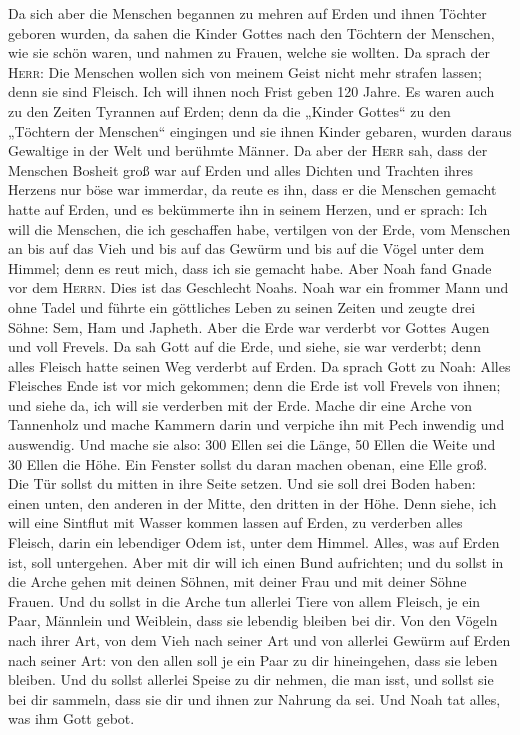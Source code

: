  Da sich aber die Menschen begannen zu mehren auf Erden
und ihnen Töchter geboren wurden,  da sahen die Kinder
Gottes nach den Töchtern der Menschen, wie sie schön waren, und nahmen
zu Frauen, welche sie wollten.  Da sprach der
\textsc{Herr}: Die Menschen wollen sich von meinem Geist nicht mehr
strafen lassen; denn sie sind Fleisch. Ich will ihnen noch Frist geben
120 Jahre.  Es waren auch zu den Zeiten Tyrannen auf
Erden; denn da die „Kinder Gottes`` zu den „Töchtern der Menschen``
eingingen und sie ihnen Kinder gebaren, wurden daraus Gewaltige in der
Welt und berühmte Männer.  Da aber der \textsc{Herr} sah,
dass der Menschen Bosheit groß war auf Erden und alles Dichten und
Trachten ihres Herzens nur böse war immerdar,  da reute es
ihn, dass er die Menschen gemacht hatte auf Erden, und es bekümmerte ihn
in seinem Herzen,  und er sprach: Ich will die Menschen,
die ich geschaffen habe, vertilgen von der Erde, vom Menschen an bis auf
das Vieh und bis auf das Gewürm und bis auf die Vögel unter dem Himmel;
denn es reut mich, dass ich sie gemacht habe.  Aber Noah
fand Gnade vor dem \textsc{Herrn}.  Dies ist das
Geschlecht Noahs. Noah war ein frommer Mann und ohne Tadel und führte
ein göttliches Leben zu seinen Zeiten  und zeugte drei
Söhne: Sem, Ham und Japheth.  Aber die Erde war verderbt
vor Gottes Augen und voll Frevels.  Da sah Gott auf die
Erde, und siehe, sie war verderbt; denn alles Fleisch hatte seinen Weg
verderbt auf Erden.  Da sprach Gott zu Noah: Alles
Fleisches Ende ist vor mich gekommen; denn die Erde ist voll Frevels von
ihnen; und siehe da, ich will sie verderben mit der Erde.
 Mache dir eine Arche von Tannenholz und mache Kammern
darin und verpiche ihn mit Pech inwendig und auswendig. 
Und mache sie also: 300 Ellen sei die Länge, 50 Ellen die Weite und 30
Ellen die Höhe.  Ein Fenster sollst du daran machen
obenan, eine Elle groß. Die Tür sollst du mitten in ihre Seite setzen.
Und sie soll drei Boden haben: einen unten, den anderen in der Mitte,
den dritten in der Höhe.  Denn siehe, ich will eine
Sintflut mit Wasser kommen lassen auf Erden, zu verderben alles Fleisch,
darin ein lebendiger Odem ist, unter dem Himmel. Alles, was auf Erden
ist, soll untergehen.  Aber mit dir will ich einen Bund
aufrichten; und du sollst in die Arche gehen mit deinen Söhnen, mit
deiner Frau und mit deiner Söhne Frauen.  Und du sollst
in die Arche tun allerlei Tiere von allem Fleisch, je ein Paar, Männlein
und Weiblein, dass sie lebendig bleiben bei dir.  Von den
Vögeln nach ihrer Art, von dem Vieh nach seiner Art und von allerlei
Gewürm auf Erden nach seiner Art: von den allen soll je ein Paar zu dir
hineingehen, dass sie leben bleiben.  Und du sollst
allerlei Speise zu dir nehmen, die man isst, und sollst sie bei dir
sammeln, dass sie dir und ihnen zur Nahrung da sei.  Und
Noah tat alles, was ihm Gott gebot.

